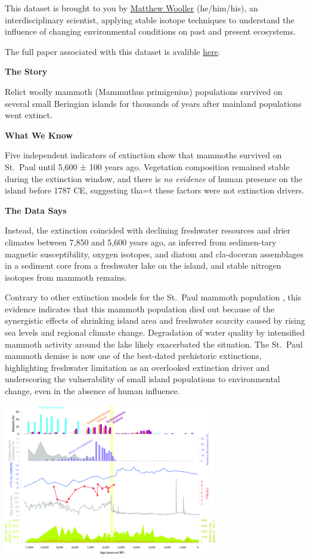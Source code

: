 \documentclass[]{book}
\begin{document}
This dataset is brought to you by \href{https://www.uaf.edu/cfos/people/faculty/detail/matthew-wooller.php}{Matthew Wooller} (he/him/his), an interdisciplinary scientist, applying stable isotope techniques to understand the influence of changing environmental conditions on past and present ecosystems.

The full paper associated with this dataset is avalible \href{https://www.pnas.org/content/113/33/9310}{here}.

\textbf{The Story}

Relict woolly mammoth (Mammuthus primigenius) populations survived on several small Beringian islands for thousands of years after mainland populations went extinct.

\textbf{What We Know}

Five independent indicators of extinction show that mammoths survived on St.~Paul until 5,600 ± 100 years ago. Vegetation composition remained stable during the extinction window, and there is \emph{no evidence} of human presence on the island before 1787 CE, suggesting tha=t these factors were not extinction drivers.

\textbf{The Data Says}

Instead, the extinction coincided with declining freshwater resources and drier climates between 7,850 and 5,600 years ago, as inferred from sedimen-tary magnetic susceptibility, oxygen isotopes, and diatom and cla-doceran assemblages in a sediment core from a freshwater lake on the island, and stable nitrogen isotopes from mammoth remains.

Contrary to other extinction models for the St.~Paul mammoth population , this evidence indicates that this mammoth population died out because of the synergistic effects of shrinking island area and freshwater scarcity caused by rising sea levels and regional climate change. Degradation of water quality by intensified mammoth activity around the lake likely exacerbated the situation. The St.~Paul mammoth demise is now one of the best-dated prehistoric extinctions, highlighting freshwater limitation as an overlooked extinction driver and underscoring the vulnerability of small island populations to environmental change, even in the absence of human influence.

\includegraphics[width=0.7\textwidth,height=\textheight]{images/woolydata.png}
\end{document}
